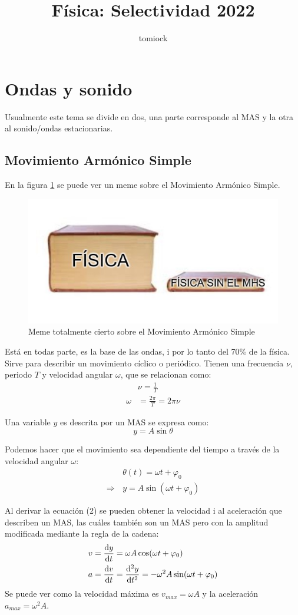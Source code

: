 \documentclass[arial,a4paper,print]{article}
\title{Física: Selectividad 2022}
\author{tomiock}
\begin{document}
\maketitle

\section{Ondas y sonido}
Usualmente este tema se divide en dos, una parte corresponde al MAS y la otra al sonido/ondas estacionarias.
\subsection{Movimiento Armónico Simple}
En la figura \ref{fig:mememhs} se puede ver un meme sobre el Movimiento Armónico Simple.
\begin{figure}[h]
	\centering
	\includegraphics[width=0.3\linewidth]{meme_MHS}
	\caption{Meme totalmente cierto sobre el Movimiento Armónico Simple}
	\label{fig:mememhs}
\end{figure}

Está en todas parte, es la base de las ondas, i por lo tanto del 70\% de la física. Sirve para describir un movimiento cíclico o periódico. Tienen una frecuencia $\nu$, periodo $T$ y velocidad angular $\omega$, que se relacionan como:
\begin{align*}
	&\nu = \frac1T \\
	\omega &= \frac{2\pi}{T} = 2\pi\nu
\end{align*}

Una variable $y$ es descrita por un MAS se expresa como:
\begin{equation*}
	y = A\sin\theta
\end{equation*}

Podemos hacer que el movimiento sea dependiente del tiempo a través de la velocidad angular $\omega$:
\begin{align}
	& \theta(t) = \omega t + \varphi_{0} \\
	\Rightarrow \,& y = A\sin(\omega t + \varphi_{0})
\end{align}

Al derivar la ecuación (2) se pueden obtener la velocidad i al aceleración que describen un MAS, las cuáles también son un MAS pero con la amplitud modificada mediante la regla de la cadena:
\begin{align*}
	 v &= \dv{y}{t} = \omega A \cos(\omega t + \varphi_{0}) \\
	 a &= \dv{v}{t} = \dv[2]{y}{t} = -\omega^{2}A\sin(\omega t + \varphi_{0})
\end{align*}
 Se puede ver como la velocidad máxima es $v_{max} = \omega A$ y la aceleración $a_{max} = \omega^{2}A$.
\end{document}
